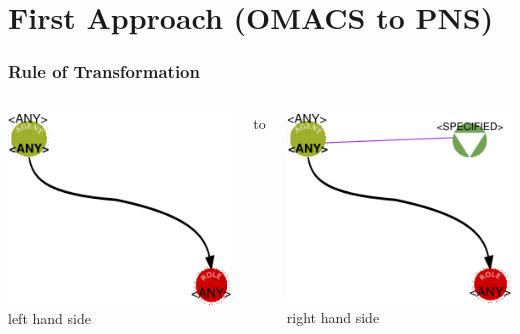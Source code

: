 \documentclass[12pt]{beamer}
\begin{document}
\section{First Approach (OMACS to PNS)}
\begin{frame}
\frametitle{Rule of Transformation} 

\begin{columns}
	
		 \begin{center}	
	\includegraphics[scale=0.5]{L2.png} \\
	left hand side
	\end{center}
	
		to
	 \begin{center}	
	\includegraphics[scale=0.5]{R2.png} \\
	right hand side
	\end{center} 
	
\end{columns}

\end{frame}
\end{document}
